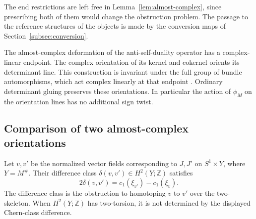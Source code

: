 \documentclass[11pt]{amsart}
\theoremstyle{definition}
\theoremstyle{remark}
\theoremstyle{plain}
\numberwithin{equation}{section}
\newcommand{\ZZ}{\mathbb Z}
\begin{document}
The end restrictions are left free in
Lemma~\ref{lem:almost-complex}, since prescribing both of them would
change the obstruction problem. The passage to the reference
structures of the objects is made by the conversion maps of
Section~\ref{subsec:conversion}.

The almost-complex deformation of the anti-self-duality operator
has a complex-linear endpoint. The complex orientation of its
kernel and cokernel orients its determinant line. This
construction is invariant under the full group of bundle
automorphisms, which act complex linearly at that endpoint
\cite[Section~5.1]{KM-unknot}. Ordinary determinant gluing preserves
these orientations. In particular the action of $\phi_M$ on the
orientation lines has no additional sign twist.

\subsection{Comparison of two almost-complex orientations}
Let $v,v'$ be the normalized vector fields corresponding to
$J,J'$ on $S^1\times Y$, where $Y=M^\#$. Their difference class
$\delta(v,v')\in H^2(Y;\ZZ)$ satisfies
\[
 2\delta(v,v')=c_1(\xi_{v'})-c_1(\xi_v).
\]
The difference class is the obstruction to homotoping $v$ to $v'$
over the two-skeleton. When $H^2(Y;\ZZ)$ has two-torsion, it is not
determined by the displayed Chern-class difference.
\end{document}
